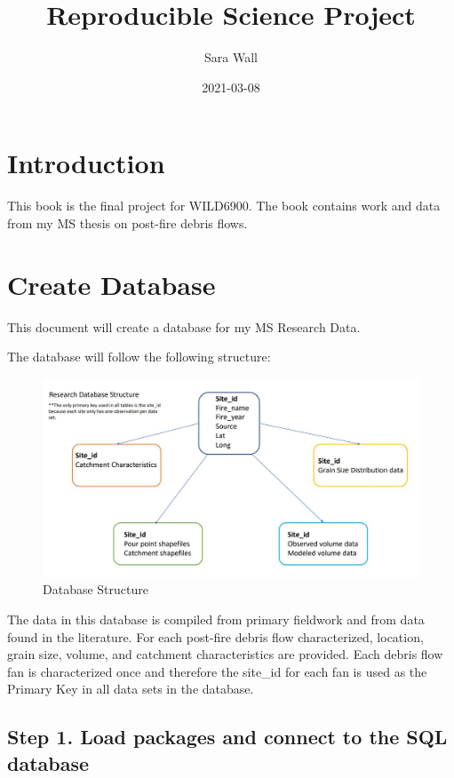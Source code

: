 \documentclass[
]{book}
\title{Reproducible Science Project}
\author{Sara Wall}
\date{2021-03-08}
\begin{document}
\maketitle

{
\setcounter{tocdepth}{1}
\tableofcontents
}
\hypertarget{introduction}{%
\chapter{Introduction}\label{introduction}}

This book is the final project for WILD6900. The book contains work and data from my MS thesis on post-fire debris flows.

\hypertarget{database}{%
\chapter{Create Database}\label{database}}

This document will create a database for my MS Research Data.

The database will follow the following structure:

\begin{figure}

{\centering \includegraphics[width=0.8\linewidth]{database_structure} 

}

\caption{Database Structure}\label{fig:image}
\end{figure}

The data in this database is compiled from primary fieldwork and from data found in the literature. For each post-fire debris flow characterized, location, grain size, volume, and catchment characteristics are provided. Each debris flow fan is characterized once and therefore the site\_id for each fan is used as the Primary Key in all data sets in the database.

\hypertarget{step-1.-load-packages-and-connect-to-the-sql-database}{%
\section{Step 1. Load packages and connect to the SQL database}\label{step-1.-load-packages-and-connect-to-the-sql-database}}
\end{document}
